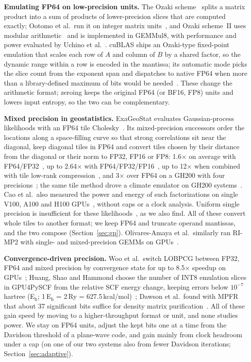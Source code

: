 \documentclass[conference]{IEEEtran}
\begin{document}
\textbf{Emulating FP64 on low-precision units.} The Ozaki scheme~\cite{Ozaki2012} splits a matrix product into a sum
of products of lower-precision slices that are computed exactly; Ootomo et al.\ run it on integer matrix
units~\cite{Ootomo2024}, and Ozaki scheme~II uses modular arithmetic~\cite{Ozaki2025} and is implemented in GEMMul8,
with performance and power evaluated by Uchino et al.~\cite{Uchino2025}. cuBLAS ships an
Ozaki-type fixed-point emulation that scales each row of $A$ and column of $B$ by a shared factor, so the dynamic
range within a row is encoded in the mantissa; its automatic mode picks the slice count from the exponent span and
dispatches to native FP64 when more than a library-defined maximum of bits would be needed~\cite{cuBLASEmu,Schwarz2026}.
These change the arithmetic format; zeroing keeps the original FP64 (or BF16, FP8) units and lowers input entropy, so
the two can be complementary.

\textbf{Mixed precision in geostatistics.} ExaGeoStat evaluates Gaussian-process likelihoods with an FP64 tile
Cholesky~\cite{Abdulah2018}. Its mixed-precision successors order the locations along a space-filling curve so that
strong correlations sit near the diagonal, keep diagonal tiles in FP64 and convert tiles chosen by their distance from
the diagonal or their norm to FP32, FP16 or FP8: 1.6$\times$ on average with FP64/FP32~\cite{Abdulah2019}, up to
2.64$\times$ with FP64/FP32/FP16~\cite{Abdulah2022}, up to 12$\times$ when combined with tile low-rank
compression~\cite{Cao2022}, and 3$\times$ over FP64 on a GH200 with four precisions~\cite{Ren2025}; the same tile method
drove a climate emulator on GH200 systems~\cite{Abdulah2024}. Cao et al.\ also measured the power and energy of such
factorizations on single V100, A100 and H100 GPUs~\cite{Cao2023}, without caps or a clock analysis. Uniform single
precision is insufficient for these likelihoods~\cite{Abdulah2022}, as we also find. All of these convert whole tiles to
another format; we keep FP64 and truncate operand mantissas, and the two compose (Section~\ref{sec:gp}).
Olivares-Amaya et al.\ similarly ran RI-MP2 with single- and mixed-precision GEMMs on GPUs~\cite{OlivaresAmaya2010}.

\textbf{Convergence-driven precision.} Woo et al.\ switch LOBPCG between FP32, FP64 and mixed precision by
convergence state for up to 8.5$\times$ speedup on GPUs~\cite{Woo2023}; Huang, Shao and Hammond choose the number of
INT8 emulation slices in GPU4PySCF from the relative SCF energy change, keeping errors below
$10^{-7}$\,hartree (E$_\mathrm{h}$; 1\,E$_\mathrm{h}$ = 2\,Ry = 627.5\,kcal/mol)~\cite{Huang2026}; Dawson et al.\ found with MPFR that about 37 significant bits suffice for density
matrix purification~\cite{Dawson2024}. All of these gain speed by moving to a higher-throughput format or unit, and
none studies power. We stay on FP64 units, adjust the kept bits one at a time from the Davidson threshold of a
plane-wave code, and gain mainly from clock headroom under a cap (on one of our two systems also from fewer
Davidson iterations; Section~\ref{sec:adaptive}).
\end{document}
